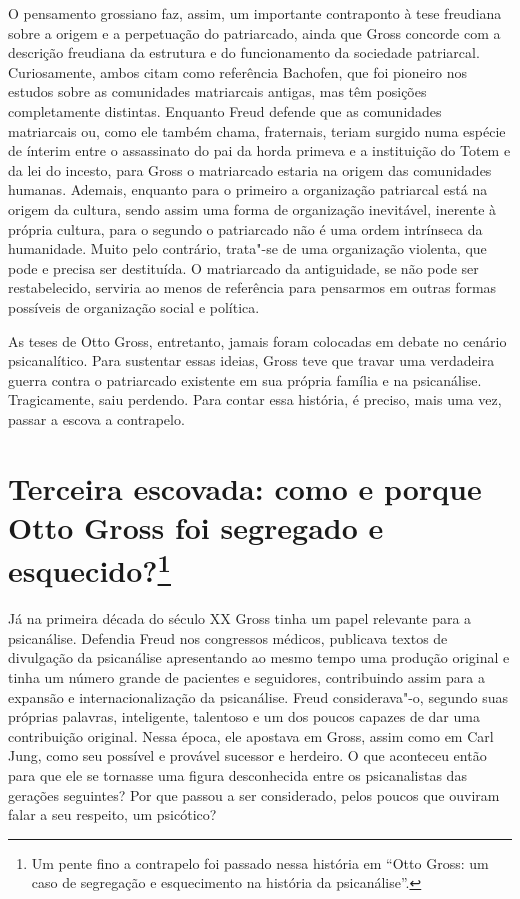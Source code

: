 O pensamento grossiano faz, assim, um importante contraponto à tese
freudiana sobre a origem e a perpetuação do patriarcado, ainda que Gross
concorde com a descrição freudiana da estrutura e do funcionamento da
sociedade patriarcal. Curiosamente, ambos citam como referência
Bachofen, que foi pioneiro nos estudos sobre as comunidades matriarcais
antigas, mas têm posições completamente distintas. Enquanto Freud
defende que as comunidades matriarcais ou, como ele também chama,
fraternais, teriam surgido numa espécie de ínterim entre o assassinato
do pai da horda primeva e a instituição do Totem e da lei do incesto,
para Gross o matriarcado estaria na origem das comunidades humanas.
Ademais, enquanto para o primeiro a organização patriarcal está na
origem da cultura, sendo assim uma forma de organização inevitável,
inerente à própria cultura, para o segundo o patriarcado não é uma ordem
intrínseca da humanidade. Muito pelo contrário, trata"-se de uma
organização violenta, que pode e precisa ser destituída. O matriarcado
da antiguidade, se não pode ser restabelecido, serviria ao menos de
referência para pensarmos em outras formas possíveis de organização
social e política.

As teses de Otto Gross, entretanto, jamais foram colocadas em debate no
cenário psicanalítico. Para sustentar essas ideias, Gross teve que
travar uma verdadeira guerra contra o patriarcado existente em sua
própria família e na psicanálise. Tragicamente, saiu perdendo. Para
contar essa história, é preciso, mais uma vez, passar a escova a
contrapelo.

\section{Terceira escovada: como e porque Otto Gross foi segregado e
esquecido?\protect\footnote{\uppercase{U}m pente fino a contrapelo foi passado nessa
  história em ``\uppercase{O}tto \uppercase{G}ross: um caso de segregação e esquecimento na
  história da psicanálise''.}}

Já na primeira década do século XX Gross tinha um papel relevante para a
psicanálise. Defendia Freud nos congressos médicos, publicava textos de
divulgação da psicanálise apresentando ao mesmo tempo uma produção
original e tinha um número grande de pacientes e seguidores,
contribuindo assim para a expansão e internacionalização da psicanálise.
Freud considerava"-o, segundo suas próprias palavras, inteligente,
talentoso e um dos poucos capazes de dar uma contribuição original.
Nessa época, ele apostava em Gross, assim como em Carl Jung, como seu
possível e provável sucessor e herdeiro. O que aconteceu então para que
ele se tornasse uma figura desconhecida entre os psicanalistas das
gerações seguintes? Por que passou a ser considerado, pelos poucos que
ouviram falar a seu respeito, um psicótico?

